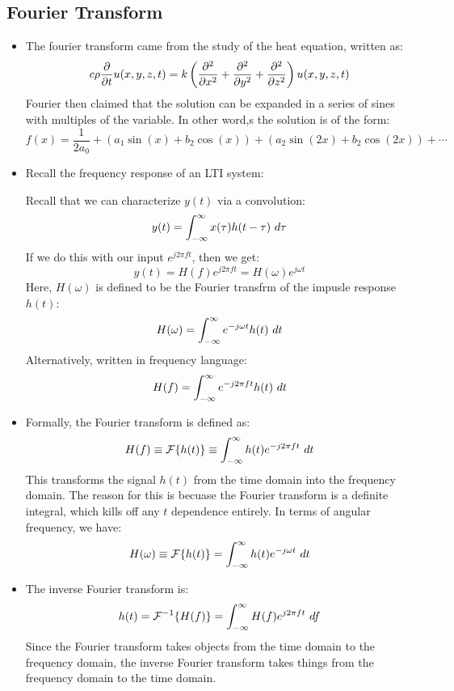 \subsection{Fourier Transform} 
\begin{itemize}
	\item The fourier transform came from the study of the heat equation, written as:
		\[
			c \rho \pdv{t} u(x, y, z, t) = k \left( \pdv[2]{x} + \pdv[2]{y} + \pdv[2]{z} \right) 
			u(x, y, z, t)
		\] 
		Fourier then claimed that the solution can be expanded in a series of sines with multiples of the variable. 
		In other word,s the solution is of the form:
		\[
		f(x) = \frac{1}{2a_0} + (a_1 \sin(x) + b_2 \cos(x)) + (a_2\sin(2x) + b_2\cos(2x)) + \cdots 
		\] 
	\item Recall the frequency response of an LTI system:
		\begin{center}
		\end{center}
		Recall that we can characterize \( y(t) \) via a convolution: 
		\[
		y(t) = \int_{-\infty}^{\infty} x(\tau) h(t - \tau) \ d  \tau 
		\] 
		If we do this with our input \( e^{j 2 \pi ft} \), then we get:
		\[
		y(t) = H(f) e^{j 2 \pi ft} = H(\omega) e^{j \omega t }
		\] 
		Here, \( H(\omega) \) is defined to be the Fourier transfrm of the impusle response \( h(t) \):
		\[
			H(\omega) = \int_{-\infty}^{\infty} e^{- j \omega t} h(t) \ d t 
		\] 
		Alternatively, written in frequency language:
		\[
		H(f) = \int_{-\infty}^{\infty} e^{-j 2 \pi ft}h(t) \ d t 
		\] 
	\item Formally, the Fourier transform is defined as:
		\[
		H(f) \equiv \mathcal F \{h(t)\} \equiv \int_{-\infty}^{\infty} h(t) e^{-j 2\pi ft }\ d  t 
		\] 
		This transforms the signal \( h(t)  \) from the time domain into the frequency domain. The reason for this 
		is becuase the Fourier transform is a definite integral, which kills off any \( t \) dependence entirely. 
		In terms of angular frequency, we have:
		\[
		H(\omega) \equiv \mathcal F \{h(t)\} = \int_{-\infty}^{\infty} h(t) e^{-j \omega t}\ d t 
		\] 
	\item The inverse Fourier transform is:
		\[
			h(t) = \mathcal F^{-1} \{H(f)\} = \int_{-\infty}^{\infty} H(f) e^{j 2\pi ft}\ d  f 
		\]
		Since the Fourier transform takes objects from the time domain to the frequency domain, the inverse 
		Fourier transform takes things from the frequency domain to the time domain. 


\end{itemize}
